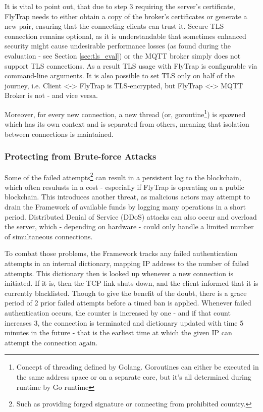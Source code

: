 It is vital to point out, that due to step 3 requiring the server's certificate, FlyTrap needs to either obtain a copy of the broker's certificates or generate a new pair, ensuring that the connecting clients can trust it. Secure TLS connection remains optional, as it is understandable that sometimes enhanced security might cause undesirable performance losses (as found during the evaluation - see Section \ref{sec:tls_eval}) or the MQTT broker simply does not support TLS connections. As a result TLS usage with FlyTrap is configurable via command-line arguments. It is also possible to set TLS only on half of the journey, i.e. Client <-> FlyTrap is TLS-encrypted, but FlyTrap <-> MQTT Broker is not - and vice versa.

Moreover, for every new connection, a new thread (or, goroutine\footnote{Concept of threading defined by Golang. Goroutines can either be executed in the same address space or on a separate core, but it's all determined during runtime by Go runtime}) is spawned which has its own context and is separated from others, meaning that isolation between connections is maintained.

\subsubsection{Protecting from Brute-force Attacks}\label{sec:ddos}
Some of the failed attempts\footnote{Such as providing forged signature or connecting from prohibited country.} can result in a persistent log to the blockchain, which often resulusts in a cost - especially if FlyTrap is operating on a public blockchain. This introduces another threat, as malicious actors may attempt to drain the Framework of available funds by logging many operations in a short period. Distributed Denial of Service (DDoS) attacks can also occur and overload the server, which - depending on hardware - could only handle a limited number of simultaneous connections.

To combat those problems, the Framework tracks any failed authentication attempts in an internal dictionary, mapping IP address to the number of failed attempts. This dictionary then is looked up whenever a new connection is initiated. If it is, then the TCP link shuts down, and the client informed that it is currently blacklisted. Though to give the benefit of the doubt, there is a grace period of 2 prior failed attempts before a timed ban is applied. Whenever failed authentication occurs, the counter is increased by one - and if that count increases 3, the connection is terminated and dictionary updated with time 5 minutes in the future - that is the earliest time at which the given IP can attempt the connection again.
